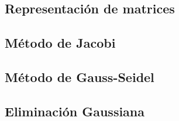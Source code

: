 \subsection{Representación de matrices}


\vspace{2em}
\subsection{Método de Jacobi}


\vspace{2em}
\subsection{Método de Gauss-Seidel}


\vspace{2em}
\subsection{Eliminación Gaussiana}